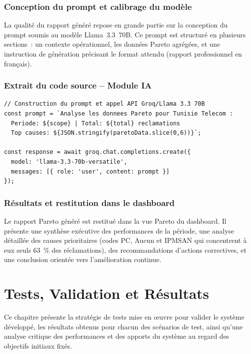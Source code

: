 \documentclass[11pt,a4paper]{report}
\begin{document}
\subsection{Conception du prompt et calibrage du modèle}

La qualité du rapport généré repose en grande partie sur la conception du prompt soumis au modèle Llama~3.3~70B. Ce prompt est structuré en plusieurs sections~: un contexte opérationnel, les données Pareto agrégées, et une instruction de génération précisant le format attendu (rapport professionnel en français).

\subsection{Extrait du code source -- Module IA}

\begin{lstlisting}[style=jsStyle, caption={Appel API Groq pour le rapport Pareto intelligent}, label={lst:groq}]
// Construction du prompt et appel API Groq/Llama 3.3 70B
const prompt = `Analyse les donnees Pareto pour Tunisie Telecom :
  Periode: ${scope} | Total: ${total} reclamations
  Top causes: ${JSON.stringify(paretoData.slice(0,6))}`;

const response = await groq.chat.completions.create({
  model: 'llama-3.3-70b-versatile',
  messages: [{ role: 'user', content: prompt }]
});
\end{lstlisting}

\subsection{Résultats et restitution dans le dashboard}

Le rapport Pareto généré est restitué dans la vue Pareto du dashboard. Il présente une synthèse exécutive des performances de la période, une analyse détaillée des causes prioritaires (codes PC, Aucun et IPMSAN qui concentrent à eux seuls 63~\% des réclamations), des recommandations d'actions correctives, et une conclusion orientée vers l'amélioration continue.

\chapter{Tests, Validation et Résultats}

Ce chapitre présente la stratégie de tests mise en \oe uvre pour valider le système développé, les résultats obtenus pour chacun des scénarios de test, ainsi qu'une analyse critique des performances et des apports du système au regard des objectifs initiaux fixés.
\end{document}
